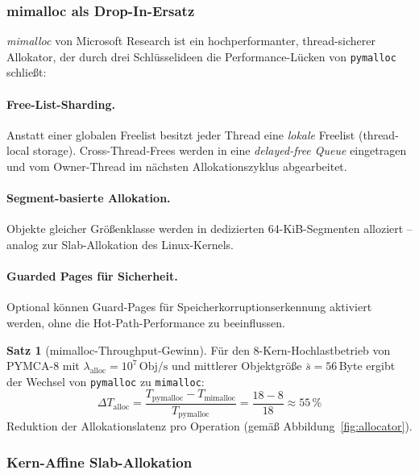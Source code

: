 ﻿\documentclass[a4paper,12pt]{scrreprt}
\theoremstyle{definition}
\newtheorem{satz}{Satz}[section]
\begin{document}
	\subsubsection{mimalloc als Drop-In-Ersatz}
	
	\emph{mimalloc} \cite{mimalloc2019} von Microsoft Research ist ein
	hochperformanter, thread-sicherer Allokator, der durch drei
	Schlüsselideen die Performance-Lücken von \texttt{pymalloc} schließt:
	
	\paragraph{Free-List-Sharding.}
	Anstatt einer globalen Freelist besitzt jeder Thread eine
	\emph{lokale} Freelist (thread-local storage). Cross-Thread-Frees
	werden in eine \emph{delayed-free Queue} eingetragen und vom
	Owner-Thread im nächsten Allokationszyklus abgearbeitet.
	
	\paragraph{Segment-basierte Allokation.}
	Objekte gleicher Größenklasse werden in dedizierten 64-KiB-Segmenten
	alloziert -- analog zur Slab-Allokation des Linux-Kernels.
	
	\paragraph{Guarded Pages für Sicherheit.}
	Optional können Guard-Pages für Speicherkorruptionserkennung
	aktiviert werden, ohne die Hot-Path-Performance zu beeinflussen.
	
	\begin{satz}[mimalloc-Throughput-Gewinn]
		\label{satz:mimalloc_gain}
		Für den 8-Kern-Hochlastbetrieb von PYMCA-8 mit
		$\lambda_{\mathrm{alloc}} = 10^7\,\mathrm{Obj/s}$ und
		mittlerer Objektgröße $\bar{s} = 56$\,Byte ergibt der
		Wechsel von \texttt{pymalloc} zu \texttt{mimalloc}:
		\[
		\Delta T_{\mathrm{alloc}} = \frac{T_{\mathrm{pymalloc}} -
			T_{\mathrm{mimalloc}}}{T_{\mathrm{pymalloc}}}
		= \frac{18 - 8}{18} \approx 55\,\%
		\]
		Reduktion der Allokationslatenz pro Operation (gemäß
		Abbildung~\ref{fig:allocator}).
	\end{satz}
	
	\subsubsection{Kern-Affine Slab-Allokation}
	
\end{document}
